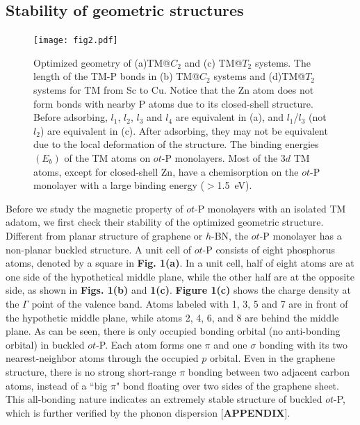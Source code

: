 \documentclass[%
superscriptaddress,
preprint,
showpacs,preprintnumbers,
 amsmath,amssymb,
prb,
]{revtex4-1}
\begin{document}
\subsection{Stability of geometric structures}


\begin{figure}[ptb]
\centering
\texttt{[image: fig2.pdf]}
\caption{{\footnotesize{}Optimized geometry of (a)TM@$C_{2}$ and
(c) TM@$T_{2}$ systems. The length of the TM-P bonds in
(b) TM@$C_{2}$ systems and (d)TM@$T_{2}$ systems for TM from
Sc to Cu. Notice that the Zn atom does not form bonds with nearby P atoms due to
its closed-shell structure. Before adsorbing, $l_1$, $l_2$, $l_3$ and $l_4$ are equivalent in (a), and $l_1$/$l_3$ (not $l_2$) are equivalent in (c). After adsorbing, they may not be equivalent due to the local deformation of the structure. The binding energies $(E_{b})$ of the TM atoms on
$ot$-P monolayers. Most of the 3$d$ TM atoms, except for closed-shell Zn, have a chemisorption on the $ot$-P monolayer with a large binding energy ($>$1.5~eV).\label{fig:OptimizedGeometry+BondLength}}}
\end{figure}

Before we study the magnetic property of $ot$-P monolayers with an isolated TM adatom, we first check their stability of the optimized geometric structure. Different from planar structure of graphene or $h$-BN, the $ot$-P monolayer has a non-planar buckled structure. A unit cell of $ot$-P consists of eight phosphorus atoms, denoted by a square in \textbf{Fig. 1(a)}. In a unit cell, half of eight atoms are at one side of the hypothetical middle plane, while the other half are at the opposite side, as shown in \textbf{Figs. 1(b)} and \textbf{1(c)}. \textbf{Figure 1(c)} shows the charge density at the $\Gamma$ point of the valence band. Atoms labeled with 1, 3, 5 and 7 are in front of the hypothetic middle plane, while atoms 2, 4, 6, and 8 are behind the middle plane. As can be seen, there is only occupied bonding orbital (no anti-bonding orbital) in buckled $ot$-P. Each atom forms one $\pi$ and one $\sigma$ bonding with its two nearest-neighbor atoms through the occupied $p$ orbital. Even in the graphene structure, there is no strong short-range $\pi$ bonding between two adjacent carbon atoms, instead of a ``big $\pi$" bond floating over two sides of the graphene sheet. This all-bonding nature indicates an extremely stable structure of buckled $ot$-P, which is further verified by the phonon dispersion [\textbf{APPENDIX}].
\end{document}
